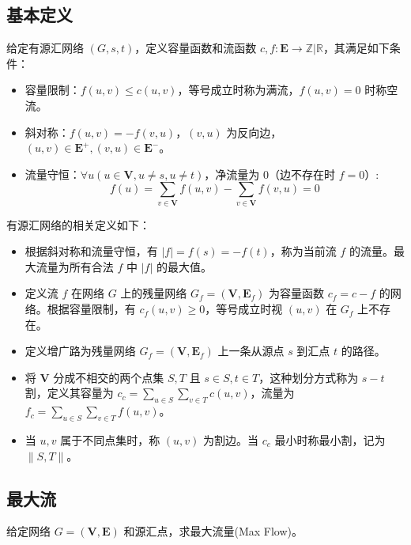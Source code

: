 \documentclass[12pt,a4paper]{article}
\begin{document}
\subsection{基本定义}
给定有源汇网络 $(G,s,t)$，定义容量函数和流函数 $c,f:\mathbf{E}\rightarrow\mathbb{Z}|\mathbb{R}$，其满足如下条件：
\begin{itemize}
	\item 容量限制：$f(u,v)\le c(u,v)$，等号成立时称为满流，$f(u,v)=0$ 时称空流。
	\item 斜对称：$f(u,v)=-f(v,u)$，$(v,u)$ 为反向边，$(u,v)\in\mathbf{E}^+,(v,u)\in\mathbf{E}^-$。
	\item 流量守恒：$\displaystyle\forall u(u\in \mathbf{V},u\ne s,u\ne t)$，净流量为 $0$（边不存在时 $f=0$）:
	\begin{equation*}
		f(u)=\sum_{v\in\mathbf{V}}f(u,v)-\sum_{v\in\mathbf{V}}f(v,u)=0
	\end{equation*}
\end{itemize}
有源汇网络的相关定义如下：
\begin{itemize}
	\item 根据斜对称和流量守恒，有 $|f|=f(s)=-f(t)$，称为当前流 $f$ 的流量。最大流量为所有合法 $f$ 中 $|f|$ 的最大值。
	\item 定义流 $f$ 在网络 $G$ 上的残量网络 $G_f=(\mathbf{V},\mathbf{E}_f)$ 为容量函数 $c_f=c-f$ 的网络。根据容量限制，有 $c_f(u,v)\ge0$，等号成立时视 $(u,v)$ 在 $G_f$ 上不存在。
	\item 定义增广路为残量网络 $G_f=(\mathbf{V},\mathbf{E}_f)$ 上一条从源点 $s$ 到汇点 $t$ 的路径。
	\item 将 $\mathbf{V}$ 分成不相交的两个点集 $S,T$ 且 $s\in S, t\in T$，这种划分方式称为 $s-t$ 割，定义其容量为 $\displaystyle c_c=\sum_{u\in S}\sum_{v\in T}c(u,v)$，流量为 $\displaystyle f_c=\sum_{u\in S}\sum_{v\in T}f(u,v)$。
	\item 当 $u,v$ 属于不同点集时，称 $(u,v)$ 为割边。当 $c_c$ 最小时称最小割，记为 $\|S,T\|$。
\end{itemize}
\subsection{最大流}
\begin{mdframed}[leftline=true, linewidth=2pt, linecolor=gray]
	给定网络 $G=(\mathbf{V}, \mathbf{E})$ 和源汇点，求最大流量(Max Flow)。
\end{mdframed}
\end{document}
